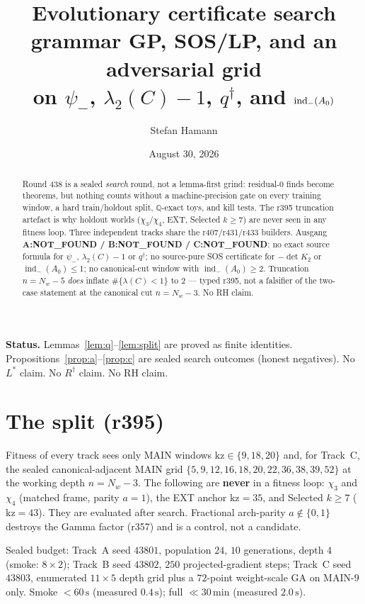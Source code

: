 \documentclass[11pt]{article}
\title{\bfseries Evolutionary certificate search\\[2mm]
\large grammar GP, SOS/LP, and an adversarial grid\\
on $\psi_-$, $\lambda_2(C)-1$, $q^\dagger$, and $\indm(A_0)$}
\author{Stefan Hamann}
\date{August 30, 2026}
\theoremstyle{remark}
\newcommand{\indm}{\operatorname{ind}_{-}}
\begin{document}
\maketitle

\begin{abstract}\noindent
Round 438 is a sealed \emph{search} round, not a lemma-first
grind: residual-$0$ finds become theorems, but nothing counts
without a machine-precision gate on every training window, a
hard train/holdout split, $\mathbb{Q}$-exact toys, and kill
tests.
The r395 truncation artefact is why holdout worlds
($\chi_3/\chi_4$, EXT, Selected $k\ge 7$) are never seen in any
fitness loop.
Three independent tracks share the r407/r431/r433 builders.
Ausgang \textbf{A:NOT\_FOUND / B:NOT\_FOUND / C:NOT\_FOUND}:
no exact source formula for $\psi_-$, $\lambda_2(C)-1$ or
$q^\dagger$; no source-pure SOS certificate for $-\det K_2$ or
$\indm(A_0)\le 1$; no canonical-cut window with
$\indm(A_0)\ge 2$.
Truncation $n=N_w-5$ \emph{does} inflate $\#\{\lambda(C)<1\}$
to $2$ --- typed r395, not a falsifier of the two-case
statement at the canonical cut $n=N_w-3$.
No RH claim.
\end{abstract}

\medskip\noindent
\textbf{Status.}\enspace
Lemmas~\ref{lem:q}--\ref{lem:split} are proved as finite
identities.
Propositions~\ref{prop:a}--\ref{prop:c} are sealed search
outcomes (honest negatives).
No $L^{*}$ claim.  No $R^\dagger$ claim.  No RH claim.

\section{The split (r395)}

Fitness of every track sees only MAIN windows
$\mathrm{kz}\in\{9,18,20\}$ and, for Track~C, the sealed
canonical-adjacent MAIN grid
$\{5,9,12,16,18,20,22,36,38,39,52\}$ at the working depth
$n=N_w-3$.
The following are \textbf{never} in a fitness loop:
$\chi_3$ and $\chi_4$ (matched frame, parity $a=1$),
the EXT anchor $\mathrm{kz}=35$, and Selected $k\ge 7$
($\mathrm{kz}=43$).
They are evaluated after search.
Fractional arch-parity $a\notin\{0,1\}$ destroys the
Gamma factor (r357) and is a control, not a candidate.

Sealed budget: Track~A seed $43801$, population $24$,
$10$ generations, depth $4$ (smoke: $8\times 2$);
Track~B seed $43802$, $250$ projected-gradient steps;
Track~C seed $43803$, enumerated $11\times 5$ depth grid
plus a $72$-point weight-scale GA on MAIN-$9$ only.
Smoke $<60\,\mathrm{s}$ (measured $0.4\,\mathrm{s}$);
full $\ll 30\,\mathrm{min}$ (measured $2.0\,\mathrm{s}$).
\end{document}
